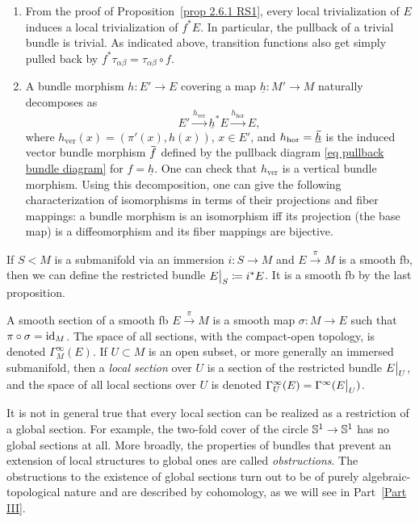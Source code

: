 \begin{rem}
\begin{enumerate}
    \item From the proof of Proposition~\ref{prop 2.6.1 RS1}, every local trivialization of $E$ induces a local trivialization of $f^\ast E$. In particular, the pullback of a trivial bundle is trivial. As indicated above, transition functions also get simply pulled back by $f^\ast \tau_{\alpha\beta}=\tau_{\alpha\beta}\circ f$.
    \item A bundle morphism $h:E'\to E$ covering a map $\underline{h}:M'\to M$ naturally decomposes as
    \[E'\overset{h_{\mathrm{ver}}}{\to} \underline{h}^\ast E\overset{h_{\mathrm{hor}}}{\to} E,\label{eq 2.6.2 RS1}\]
    where $h_{\mathrm{ver}}(x)=(\pi'(x),h(x))$, $x\in E'$, and $h_{\mathrm{hor}}=\underline{\wt{h}}$ is the induced vector bundle morphism $\wt{f}$ defined by the pullback diagram \eqref{eq pullback bundle diagram} for $f=\underline{h}$. One can check that $h_{\mathrm{ver}}$ is a vertical bundle morphism.  Using this decomposition, one can give the following characterization of isomorphisms in terms of their projections and fiber mappings: a bundle morphism is an isomorphism iff its projection (the base map) is a diffeomorphism and its fiber mappings are bijective.
\end{enumerate}
\end{rem}


\begin{defn}
    If $S< M$ is a submanifold via an immersion $i:S\to M$ and $E\overset{\pi}{\to}M$ is a smooth \gls{fb}, then we can define the restricted bundle $\restr{E}{S}\coloneqq i^\ast E$. It is a smooth \gls{fb} by the last proposition.
\end{defn}

\begin{defn}
    A smooth section of a smooth \gls{fb} $E\overset{\pi}{\to}M$ is a smooth map $\sigma:M\to E$ such that $\pi\circ \sigma=\operatorname{id}_M$. The space of all sections, with the compact-open topology, is denoted $\Gamma^\infty_M(E)$. If $U\subset M$ is an open subset, or more generally an immersed submanifold, then a \emph{local section} over $U$ is a section of the restricted bundle $\restr{E}{U}$, and the space of all local sections over $U$ is denoted $\Gamma^\infty_U(E)=\Gamma^\infty(\restr{E}{U})$.
\end{defn}
\begin{rem}
    It is not in general true that every local section can be realized as a restriction of a global section. For example, the two-fold cover of the circle $\mathbb{S}^1\to \mathbb{S}^1$ has no global sections at all. More broadly, the properties of bundles that prevent an extension of local structures to global ones are called \emph{obstructions}. The obstructions to the existence of global sections turn out to be of purely algebraic-topological nature and are described by cohomology, as we will see in Part~\ref{Part III}.
\end{rem}


